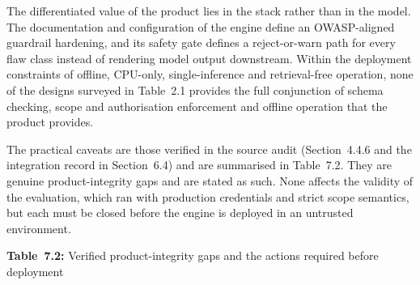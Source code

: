 \documentclass[
]{article}
\begin{document}
The differentiated value of the product lies in the stack rather than in
the model. The documentation and configuration of the engine define an
OWASP-aligned guardrail hardening, and its safety gate defines a
reject-or-warn path for every flaw class instead of rendering model
output downstream. Within the deployment constraints of offline,
CPU-only, single-inference and retrieval-free operation, none of the
designs surveyed in Table~2.1 provides the full conjunction of schema
checking, scope and authorisation enforcement and offline operation that
the product provides.

The practical caveats are those verified in the source audit
(Section~4.4.6 and the integration record in Section~6.4) and are
summarised in Table~7.2. They are genuine product-integrity gaps and are
stated as such. None affects the validity of the evaluation, which ran
with production credentials and strict scope semantics, but each must be
closed before the engine is deployed in an untrusted environment.

\protect\hypertarget{_Toc900143}{}{}\textbf{Table~7.2:} Verified
product-integrity gaps and the actions required before deployment
\end{document}
